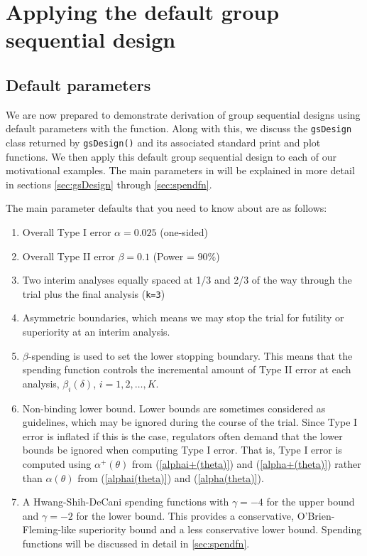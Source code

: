 \section{Applying the default group sequential design\label{sec:default}}
\subsection{Default parameters}
We are now prepared to demonstrate derivation of group sequential designs using default parameters with the  function.
Along with this, we discuss the \texttt{gsDesign} class returned by \texttt{gsDesign()} and its associated standard print and plot functions. 
We then apply this default group sequential design to each of our motivational examples. 
The main parameters in  will be explained in more detail in sections \ref{sec:gsDesign} through \ref{sec:spendfn}.

The main parameter defaults that you need to know about are as follows:

\begin{enumerate}
\item Overall Type I error $\alpha = 0.025$ (one-sided)

\item Overall Type II error $\beta = 0.1$ (Power = $90\%$)

\item Two interim analyses equally spaced at 1/3 and 2/3 of the way through the trial plus the final analysis (\texttt{k=3})

\item Asymmetric boundaries, which means we may stop the trial for futility or
superiority at an interim analysis.

\item $\beta$-spending is used to set the lower stopping
boundary. This means that the spending function controls the incremental
amount of Type II error at each analysis, $\beta_i(\delta)$, $i=1,2,\ldots,K$.

\item Non-binding lower bound. Lower bounds are sometimes considered as
guidelines, which may be ignored during the course of the trial. 
Since Type I error is inflated if this is the case, regulators often demand that the lower bounds be ignored when computing Type I error.
That is, Type I error is computed using $\alpha^+(\theta)$ from (\ref{alphai+(theta)}) and (\ref{alpha+(theta)}) rather than $\alpha(\theta)$ from (\ref{alphai(theta)}) and (\ref{alpha(theta)}). 

\item A Hwang-Shih-DeCani spending functions with $\gamma = -4$ for the upper
bound and $\gamma = -2$ for the lower bound. This provides a conservative,
O'Brien-Fleming-like superiority bound and a less conservative lower bound.
Spending functions will be discussed in detail in \ref{sec:spendfn}.
\end{enumerate}

